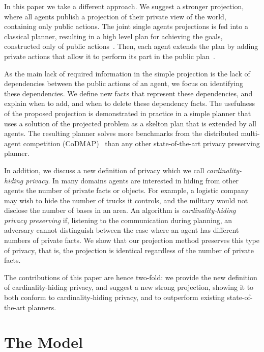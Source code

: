 \documentclass[letterpaper]{article}
\theoremstyle{definition}
\begin{document}
In this paper we take a different approach. We suggest a stronger projection, where all agents publish a projection of their private view of the world, containing only public actions. The joint single agents projections is fed into a classical planner, resulting in a high level plan for achieving the goals, constructed only of public actions~\cite{maliah2014privacyPreserving}. Then, each agent extends the plan by adding private actions that allow it to perform its part in the public plan~\cite{tozicak2015onInternally}. 

As the main lack of required information in the simple projection is the lack of dependencies between the public actions of an agent, we focus on identifying these dependencies. We define new facts that represent these dependencies, and explain when to add, and when to delete these dependency facts. The usefulness of the proposed projection is demonstrated in practice in a simple planner that uses a solution of the projected problem as a skelton plan that is extended by all agents. The resulting planner solves more benchmarks from the distributed multi-agent competition (CoDMAP)~\cite{vstolba2015competition} than any other state-of-the-art privacy preserving planner. 


In addition, we discuss a new definition of privacy which we call {\em cardinality-hiding privacy}. In many domains agents are interested in hiding from other agents the number of private facts or objects. For example, a logistic company may wish to hide the number of trucks it controls, and the military would not disclose the number of bases in an area. An algorithm is {\em cardinality-hiding privacy preserving} if, listening to the communication during planning, an adversary cannot distinguish between the case where an agent has different numbers of private facts. We show that our projection method preserves this type of privacy, that is, the projection is identical regardless of the number of private facts. 

The contributions of this paper are hence two-fold: we provide the new definition of cardinality-hiding privacy, and suggest a new strong projection, showing it to both conform to cardinality-hiding privacy, and to outperform existing state-of-the-art planners.

\section{The Model}
\end{document}
